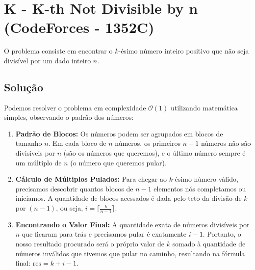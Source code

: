 \documentclass[12pt,a4paper]{article}
\begin{document}
\section{K - K-th Not Divisible by n (CodeForces - 1352C)}

O problema consiste em encontrar o $k$-ésimo número inteiro positivo que não seja divisível por um dado inteiro $n$. 

\subsection{Solução}

Podemos resolver o problema em complexidade $\mathcal{O}(1)$ utilizando matemática simples, observando o padrão dos números:

\begin{enumerate}
    \item \textbf{Padrão de Blocos:} Os números podem ser agrupados em blocos de tamanho $n$. Em cada bloco de $n$ números, os primeiros $n-1$ números não são divisíveis por $n$ (são os números que queremos), e o último número sempre é um múltiplo de $n$ (o número que queremos pular).
    
    \item \textbf{Cálculo de Múltiplos Pulados:} Para chegar ao $k$-ésimo número válido, precisamos descobrir quantos blocos de $n-1$ elementos nós completamos ou iniciamos. A quantidade de blocos acessados é dada pelo teto da divisão de $k$ por $(n-1)$, ou seja, $i = \lceil \frac{k}{n-1} \rceil$.
    
    \item \textbf{Encontrando o Valor Final:} A quantidade exata de números divisíveis por $n$ que ficaram para trás e precisamos pular é exatamente $i - 1$. Portanto, o nosso resultado procurado será o próprio valor de $k$ somado à quantidade de números inválidos que tivemos que pular no caminho, resultando na fórmula final: $\text{res} = k + i - 1$.
\end{enumerate}
\end{document}

